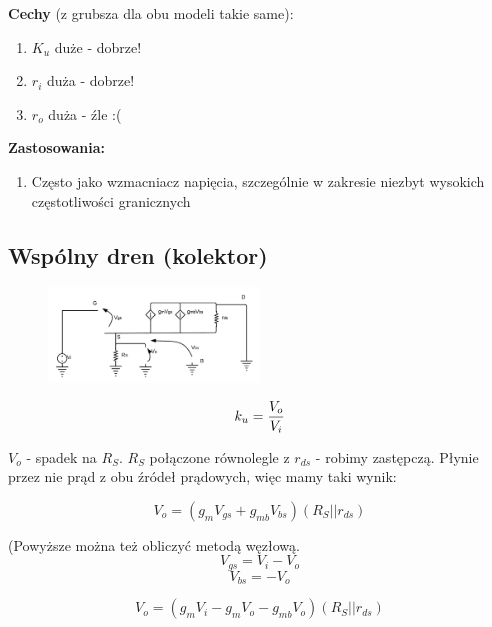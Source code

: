 \documentclass[10pt,a4paper]{article}
\begin{document}
\textbf{Cechy} (z grubsza dla obu modeli takie same):
\begin{enumerate}
	\item \textbf{$K_u$} duże - dobrze!
	\item \textbf{$r_i$} duża - dobrze!
	\item \textbf{$r_o$} duża - źle :(
\end{enumerate}
\textbf{Zastosowania:}
\begin{enumerate}
	\item Często jako wzmacniacz napięcia, szczególnie w zakresie niezbyt wysokich częstotliwości granicznych
\end{enumerate}

\subsection{Wspólny dren (kolektor)}


\begin{figure}[H]
\centering
\includegraphics[width=0.5\textwidth]{CD.png}
\end{figure}

\begin{equation}
k_u = {V_o \over V_i}
\end{equation}

$V_o$ - spadek na $R_S$. $R_S$ połączone równolegle z $r_{ds}$ - robimy zastępczą. Płynie przez nie prąd z obu źródeł prądowych, więc mamy taki wynik:

\begin{equation}
V_o = {(g_mV_{gs} + g_{mb}V_{bs})(R_S || r_{ds})}
\end{equation}

(Powyższe można też obliczyć metodą węzłową.
\begin{equation}
V_{gs} = V_i - V_o
\end{equation}
\begin{equation}
V_{bs} = - V_o
\end{equation}

\begin{equation}
V_o = {(g_mV_i - g_mV_o - g_{mb}V_{o})(R_S || r_{ds})}
\end{equation}
\end{document}
